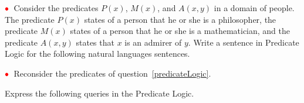 \documentclass[12pt]{exam}
\newcommand{\red}[1]{{\color{red}#1}}
\newcommand{\redbullet}{\red{\bullet}}
\newcommand{\<}{\langle}
\renewcommand{\>}{\rangle}
\theoremstyle{definition}   %
\begin{document}
\begin{questions}
\question\label{predicateLogic} 
$\redbullet$\ 
Consider the predicates $P(x)$, $M(x)$, and
$A(x,y)$ in a domain of people.  The predicate $P(x)$
states of a person that he or she is a philosopher, the predicate $M(x)$ states
of a person that he or she is a mathematician, and the predicate $A(x,y)$ states
that $x$ is an admirer of $y$.  Write a sentence in Predicate Logic for
the following natural languages sentences.


\question $\redbullet$\ Reconsider the predicates of question~\ref{predicateLogic}.

Express the following queries in the Predicate Logic.

\end{questions}
\end{document}
